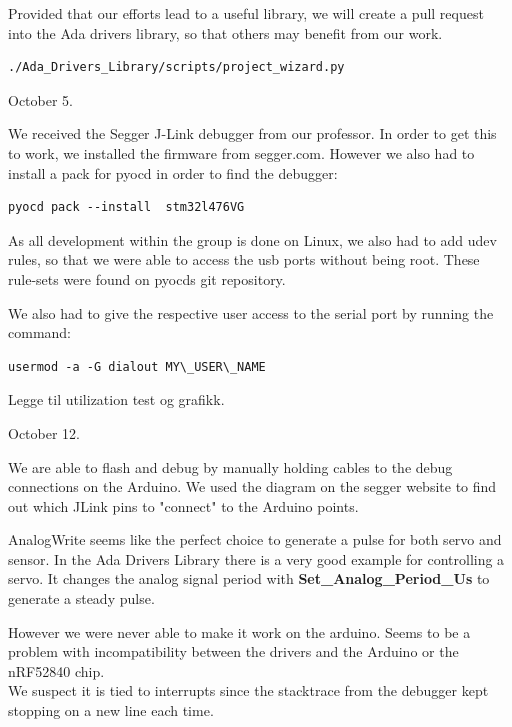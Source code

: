 \documentclass{article}
\begin{document}
Provided that our efforts lead to a useful library, we will create a pull request into the Ada drivers library, so that others may benefit from our work.

\begin{lstlisting}
./Ada_Drivers_Library/scripts/project_wizard.py
\end{lstlisting}

\vspace{5mm}

October 5.

We received the Segger J-Link debugger from our professor. In order to get this to work, we installed the firmware from segger.com. However we also had to install a pack for pyocd in order to find the debugger:


\begin{lstlisting}
pyocd pack --install  stm32l476VG
\end{lstlisting}

As all development within the group is done on Linux, we also had to add udev rules, so that we were able to access the usb ports without being root. These rule-sets were found on pyocds git repository.

We also had to give the respective user access to the serial port by running the command:
\begin{lstlisting}
usermod -a -G dialout MY\_USER\_NAME
\end{lstlisting}

Legge til utilization test og grafikk.
\vspace{5mm}

October 12.

We are able to flash and debug by manually holding cables to the debug connections on the Arduino. We used the diagram on the segger website \cite{JLINK} to find out which JLink pins to "connect" to the Arduino points.

AnalogWrite seems like the perfect choice to generate a pulse for both servo and sensor. In the Ada Drivers Library \cite{ADADRIVERSLIBRARY} there is a very good example for controlling a servo. It changes the analog signal period with \textbf{Set\_Analog\_Period\_Us} to generate a steady pulse.

However we were never able to make it work on the arduino. Seems to be a problem with incompatibility between the drivers and the Arduino or the nRF52840 chip.\\
We suspect it is tied to interrupts since the stacktrace from the debugger kept stopping on a new line each time.
\end{document}
